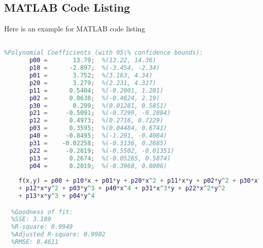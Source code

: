 \begin{appendix}
\vfill


\pagebreak


\section{MATLAB Code Listing}
Here is an example for MATLAB code listing

\vfill

\begin{lstlisting}[language=MATLAB,title=MATLAB Listing Title]
%% Linear model Poly44 from MATLAB Curve Fit App:

%Polynomial Coefficients (with 95\% confidence bounds):
       p00 =       13.79;  %(13.22, 14.36)
       p10 =      -2.897;  %(-3.454, -2.34)
       p01 =       3.752;  %(3.163, 4.34)
       p20 =       3.279;  %(2.231, 4.327)
       p11 =      0.5404;  %(-0.2001, 1.281)
       p02 =      0.8638;  %(-0.4624, 2.19)
       p30 =       0.299;  %(0.01281, 0.5851)
       p21 =     -0.5091;  %(-0.7299, -0.2884)
       p12 =      0.4973;  %(0.2716, 0.7229)
       p03 =      0.3595;  %(0.04484, 0.6741)
       p40 =     -0.8495;  %(-1.291, -0.4084)
       p31 =    -0.02258;  %(-0.3136, 0.2685)
       p22 =     -0.2819;  %(-0.5502, -0.01351)
       p13 =      0.2674;  %(-0.05265, 0.5874)
       p04 =      0.2019;  %(-0.3968, 0.8006)
       
  	f(x,y) = p00 + p10*x + p01*y + p20*x^2 + p11*x*y + p02*y^2 + p30*x^3 + p21*x^2*y 
  	+ p12*x*y^2 + p03*y^3 + p40*x^4 + p31*x^3*y + p22*x^2*y^2 
  	+ p13*x*y^3 + p04*y^4

  %Goodness of fit:
  %SSE: 3.189
  %R-square: 0.9949
  %Adjusted R-square: 0.9902
  %RMSE: 0.4611
\end{lstlisting}

\begin{lstlisting}[language=Python, title=Basic Stokes PDE's with Python3 and NGSolve, label=basic_stokes]
    

\end{lstlisting}
\end{appendix}
